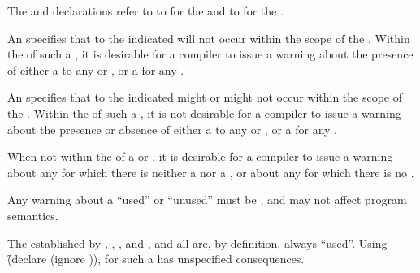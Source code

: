 The  and  declarations
refer to   
    to   for the 
and to   for the .

An   specifies that
  to the indicated 
will not
occur within the scope of the .
Within the  of such a ,
it is desirable
for a compiler to issue a warning about 
the presence of
either a   to any  or ,
    or a   for any .

An   specifies that 
  to the indicated 
might or might not
occur within the scope of the .
Within the  of such a ,
it is not desirable
for a compiler to issue a warning about
the presence or absence of
either a   to any  or ,
    or a   for any .

When not within the  
of a  or  ,
it is desirable
for a compiler to issue a warning about
any  for which there is 
neither a   
    nor a  ,
or about
any  for which there is 
     no  .

Any warning about a ``used'' or ``unused''  must be ,
and may not affect program semantics.


The  established by 
     ,
     ,
     ,
 and ,
and all  are, by definition, always ``used''.
Using \f{(declare (ignore ))}, 
for such a   has unspecified consequences.

